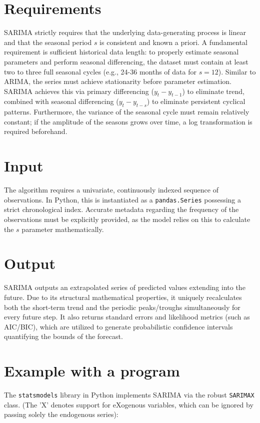 \section{Requirements}
SARIMA strictly requires that the underlying data-generating process is linear and that the seasonal period $s$ is consistent and known a priori. A fundamental requirement is sufficient historical data length: to properly estimate seasonal parameters and perform seasonal differencing, the dataset must contain at least two to three full seasonal cycles (e.g., 24-36 months of data for $s=12$). Similar to ARIMA, the series must achieve stationarity before parameter estimation. SARIMA achieves this via primary differencing ($y_t - y_{t-1}$) to eliminate trend, combined with seasonal differencing ($y_t - y_{t-s}$) to eliminate persistent cyclical patterns. Furthermore, the variance of the seasonal cycle must remain relatively constant; if the amplitude of the seasons grows over time, a log transformation is required beforehand.

\section{Input}
The algorithm requires a univariate, continuously indexed sequence of observations. In Python, this is instantiated as a \texttt{pandas.Series} possessing a strict chronological index. Accurate metadata regarding the frequency of the observations must be explicitly provided, as the model relies on this to calculate the $s$ parameter mathematically.

\section{Output}
SARIMA outputs an extrapolated series of predicted values extending into the future. Due to its structural mathematical properties, it uniquely recalculates both the short-term trend and the periodic peaks/troughs simultaneously for every future step. It also returns standard errors and likelihood metrics (such as AIC/BIC), which are utilized to generate probabilistic confidence intervals quantifying the bounds of the forecast.

\section{Example with a program}
The \texttt{statsmodels} library in Python implements SARIMA via the robust \texttt{SARIMAX} class. (The 'X' denotes support for eXogenous variables, which can be ignored by passing solely the endogenous series):

